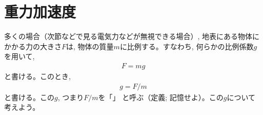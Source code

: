 \section{重力加速度}

多くの場合（次節などで見る電気力などが無視できる場合）, 地表にある物体にかかる力の大きさ$F$は, 
物体の質量$m$に比例する。すなわち, 何らかの比例係数$g$を用いて, 
\begin{eqnarray}
F=mg\label{eq:gravity_earth}
\end{eqnarray}
と書ける。このとき, 
\begin{eqnarray}
g=F/m\label{eq:gravity_earth1}
\end{eqnarray}
と書ける。この$g$, つまり$F/m$を「」
と呼ぶ（定義; 記憶せよ）。この$g$について考えよう。

